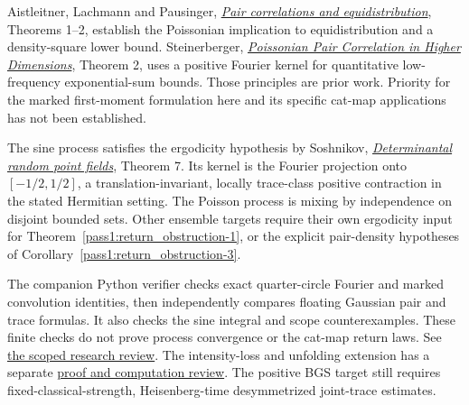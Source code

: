 Aistleitner, Lachmann and Pausinger,
\href{https://arxiv.org/abs/1612.05495}{\emph{Pair correlations and equidistribution}},
Theorems 1--2, establish the Poissonian implication to equidistribution and a
density-square lower bound. Steinerberger,
\href{https://arxiv.org/abs/1812.10458}{\emph{Poissonian Pair Correlation in Higher Dimensions}},
Theorem 2, uses a positive Fourier kernel for quantitative low-frequency
exponential-sum bounds. Those principles are prior work. Priority for the
marked first-moment formulation here and its specific cat-map applications
has not been established.

The sine process satisfies the ergodicity hypothesis by Soshnikov,
\href{https://arxiv.org/abs/math/0002099}{\emph{Determinantal random point fields}},
Theorem 7. Its kernel is the Fourier projection onto \([-1/2,1/2]\), a
translation-invariant, locally trace-class positive contraction in the stated
Hermitian setting. The Poisson process is mixing by independence on disjoint
bounded sets. Other ensemble targets require their own ergodicity input for
Theorem~\ref{pass1:return_obstruction-1}, or the explicit pair-density hypotheses of Corollary~\ref{pass1:return_obstruction-3}.

The companion Python verifier checks exact quarter-circle Fourier and marked
convolution identities, then independently compares floating Gaussian pair
and trace formulas. It also checks the sine integral and scope counterexamples.
These finite checks do not prove process convergence or the cat-map return laws.
See \href{https://github.com/ChurilovMaksim/BGS/blob/main/record/return_obstruction_review_20260912.md}{the scoped research review}.
The intensity-loss and unfolding extension has a separate
\href{https://github.com/ChurilovMaksim/BGS/blob/main/record/return_local_limits_review_20260913.md}{proof and computation review}.
The positive BGS target still requires fixed-classical-strength,
Heisenberg-time desymmetrized joint-trace estimates.
